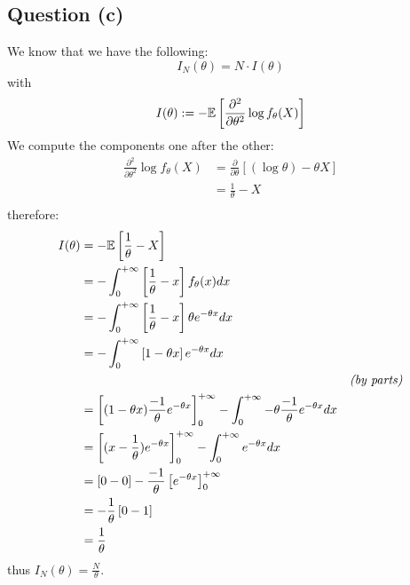 \documentclass[12pt]{article}
\begin{document}
\subsection{Question (c)}
We know that we have the following:
\begin{equation}
    I_N (\theta) = N \cdot I (\theta)
\end{equation}
with
\begin{equation}
    I(\theta) := -\mathbb{E} \left[ \frac{\partial^2}{\partial \theta^2} \log f_\theta(X) \right]
\end{equation}
We compute the components one after the other:
\begin{align*}
    \frac{\partial^2}{\partial \theta^2} \log f_\theta(X)
     & = \frac{\partial}{\partial \theta} \left[(\log \theta) - \theta X \right] \\
     & = \frac{1}{\theta} - X                                                    \\
\end{align*}
therefore:
\begin{align*}
    I(\theta)
     & = -\mathbb{E} \left[ \frac{1}{\theta} - X \right]                                                                                                                    \\
     & = -\int_0^{+\infty} \left[ \frac{1}{\theta} - x \right] f_{\theta}(x) dx                                                                                     \\
     & = -\int_0^{+\infty} \left[ \frac{1}{\theta} - x \right] \theta e^{-\theta x} dx                                                                              \\
     & = -\int_0^{+\infty} \left[ 1 - \theta x \right] e^{-\theta x} dx                                                                                             \\
     &                                                                                                                                        & \textit{(by parts)} \\
     & = \left[ (1-\theta x) \frac{-1}{\theta} e^{-\theta x}\right]_{0}^{+\infty}-\int_0^{+\infty} - \theta \frac{-1}{\theta}e^{-\theta x} dx                       \\
     & = \left[ (x -\frac{1}{\theta}) e^{-\theta x}\right]_{0}^{+\infty}-\int_0^{+\infty} e^{-\theta x} dx                                                          \\
     & = \left[ 0 - 0 \right] - \frac{-1}{\theta}\left[e^{-\theta x}\right]_0^{+\infty}                                                                                                   \\
     & = -\frac{1}{\theta}\left[0 - 1\right]                                                                                                   \\
     & = \frac{1}{\theta}                                                                                                   \\
\end{align*}
thus \(I_N (\theta) = \frac{N}{\theta}\).
\end{document}
